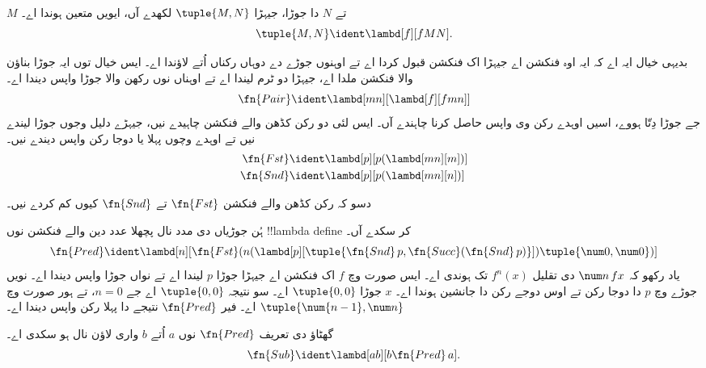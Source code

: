 \documentclass[../../../include/open-logic-section]{subfiles}
\begin{document}

\begin{defn}
$M$ تے $N$ دا جوڑا، جیہڑا $\tuple{M,N}$ لکھدے آں، ایویں
متعین ہوندا اے۔
\[
\tuple{M,N} \ident \lambd[f][fMN].
\]
\end{defn}

بدیہی خیال ایہ اے کہ ایہ اوہ فنکشن اے جیہڑا اک فنکشن قبول
کردا اے تے اوہنوں جوڑے دے دوہاں رکناں اُتے لاؤندا اے۔ ایس
خیال توں ایہ جوڑا بناؤن والا فنکشن ملدا اے، جیہڑا دو ٹرم
لیندا اے تے اوہناں نوں رکھن والا جوڑا واپس دیندا اے۔
\[
  \fn{Pair} \ident \lambd[mn][\lambd[f][fmn]]
\]
جے جوڑا دِتّا ہووے، اسیں اوہدے رکن وی واپس حاصل کرنا چاہندے آں۔
ایس لئی دو رکن کڈھن والے فنکشن چاہیدے نیں، جیہڑے دلیل وجوں جوڑا
لیندے نیں تے اوہدے وچوں پہلا یا دوجا رکن واپس دیندے نیں۔
\begin{align*}
  \fn{Fst} & \ident \lambd[p][p(\lambd[mn][m])]\\
  \fn{Snd} & \ident \lambd[p][p(\lambd[mn][n])]
\end{align*}

\begin{prob}
  دسو کہ رکن کڈھن والے فنکشن $\fn{Fst}$ تے $\fn{Snd}$ کیوں
  کم کردے نیں۔
\end{prob}

ہُن جوڑیاں دی مدد نال پچھلا عدد دین والے فنکشن نوں
!!{lambda define} کر سکدے آں۔
\[
  \fn{Pred} \ident \lambd[n][\fn{Fst}(n (\lambd[p][\tuple{\fn{Snd}\, {p}, \fn{Succ}(\fn{Snd}\, {p})}]) \tuple{\num 0, \num 0})]
\]
یاد رکھو کہ $\num n\, f x$ دی تقلیل $f^{n}(x)$ تک ہوندی
اے۔ ایس صورت وچ $f$ اک فنکشن اے جیہڑا جوڑا $p$ لیندا اے
تے نواں جوڑا واپس دیندا اے۔ نویں جوڑے وچ $p$ دا دوجا رکن
تے اوس دوجے رکن دا جانشین ہوندا اے۔ $x$ جوڑا $\tuple{0,0}$
اے۔ سو نتیجہ $\tuple{0,0}$ اے جے $n=0$، تے ہور صورت وچ
$\tuple{\num{n-1}, \num n}$ اے۔ فیر $\fn{Pred}$ نتیجے دا پہلا
رکن واپس دیندا اے۔

گھٹاؤ دی تعریف $\fn{Pred}$ نوں $a$ اُتے $b$ واری لاؤن نال
ہو سکدی اے۔
\[
\fn{Sub} \ident \lambd[ab][b \fn{Pred}\, a].
\]
\end{document}
